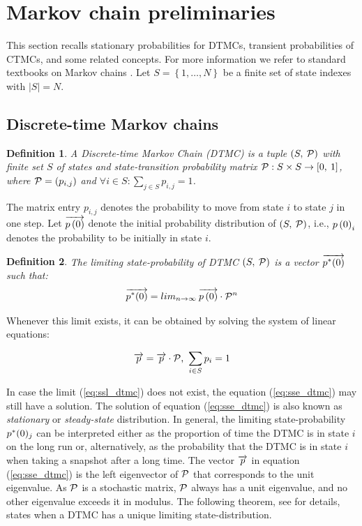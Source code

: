 \documentclass[a4paper,11pt]{article}
\newcommand{\Section}[1]{\section{#1}}
\newcommand{\SubSection}[1]{\subsection{#1}}
\newtheorem{definition}{Definition}
\begin{document}
\Section{Markov chain preliminaries \label{s:concepts}}

		This section recalls stationary probabilities for DTMCs, transient probabilities of CTMCs, and some related concepts.   For more information we refer to standard textbooks on Markov chains \cite{Tijms_03, Haverkort_98}.  Let $S = \left\{1, \ldots,N \right\}$ be a finite set of state indexes with $|S|=N$.
	
\SubSection{Discrete-time Markov chains}

		\begin{definition}
			A Discrete-time Markov Chain (\emph{DTMC}) is a tuple $\left( S,\: \mathcal{P} \right)$ with finite set $S$ of states and state-transition probability matrix $\mathcal{P} : S \times S \rightarrow \left[0,\:1 \right]$, where $\mathcal{P}=\left(p_{i,j}\right)$ and $\forall i \in S : \sum_{j \in S} p_{i,j}=1$.
		\end{definition}
		
		The matrix entry $p_{i,j}$ denotes the probability to move from state $i$ to state $j$ in one step.  Let $\overrightarrow{p \left( 0 \right)}$ denote the initial probability distribution of $\left( S,\: \mathcal{P} \right)$, i.e., $p\left( 0 \right)_{i}$ denotes the probability to be initially in state $i$.

		\begin{definition}
		The \emph{limiting} state-probability of  DTMC $\left( S,\: \mathcal{P} \right)$ is a vector $\overrightarrow{p^{*}(0)}$ such that:
			\begin{equation}
				\overrightarrow{p^{*}(0)} = lim_{n \to \infty} \: \overrightarrow{p \left( 0 \right)} \cdot \mathcal{P}^{n}
				\label{eq:ssl_dtmc}
			\end{equation}
		\end{definition}
		
		Whenever this limit exists, it can be obtained by solving the system of linear equations:
		
		\begin{equation}
			\overrightarrow{p} = \overrightarrow{p} \cdot \mathcal{P} \text{, }\sum_{i \in S} p_{i} = 1
			\label{eq:sse_dtmc}
		\end{equation}
				
		In case the limit (\ref{eq:ssl_dtmc}) does not exist, the equation (\ref{eq:sse_dtmc}) may still have a solution.  The solution of equation (\ref{eq:sse_dtmc}) is also known as \emph{stationary} or \emph{steady-state} distribution.	
		In general, the limiting state-probability $p^{*}(0)_{j}$ can be interpreted either as the proportion of time the DTMC is in state $i$ on the long run or, alternatively, as the probability that the DTMC is in state $i$ when taking a snapshot after a long time.  The vector $\overrightarrow{p}$ in equation (\ref{eq:sse_dtmc}) is the left eigenvector of $\mathcal{P}$ that corresponds to the unit eigenvalue.  As $\mathcal{P}$ is a stochastic matrix, $\mathcal{P}$ always has a unit eigenvalue, and no other eigenvalue exceeds it in modulus.  The following theorem, see \cite{Haverkort_98} for details, states when a DTMC has a unique limiting state-distribution.
		
\end{document}
